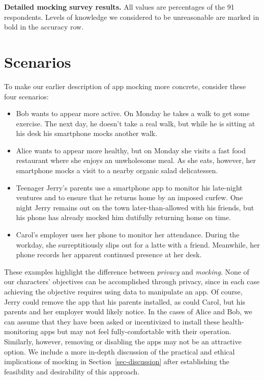 
\begin{table*}[t]



\caption{\textbf{Detailed mocking survey results.} All values are percentages
of the 91 respondents. Levels of knowledge we considered to be unreasonable
are marked in bold in the accuracy row.}

\label{table-surveyresults}

\end{table*}

\section{Scenarios}
\label{sec-scenarios}

To make our earlier description of app mocking more concrete, consider these
four scenarios:

\begin{itemize}

\item Bob wants to appear more active. On Monday he takes a walk to get some
exercise. The next day, he doesn't take a real walk, but while he is sitting
at his desk his smartphone mocks another walk.

\item Alice wants to appear more healthy, but on Monday she visits a fast
food restaurant where she enjoys an unwholesome meal. As she eats, however, her
smartphone mocks a visit to a nearby organic salad delicatessen.

\item Teenager Jerry's parents use a smartphone app to monitor his late-night
  ventures and to ensure that he returns home by an imposed curfew. One
  night Jerry remains out on the town later-than-allowed with his friends,
  but his phone has already mocked him dutifully returning home on time.

\item Carol's employer uses her phone to monitor her attendance. During the
workday, she surreptitiously slips out for a latte with a friend.  Meanwhile,
her phone records her apparent continued presence at her desk.

\end{itemize}

These examples highlight the difference between \textit{privacy} and
\textit{mocking}. None of our characters' objectives can be accomplished
through privacy, since in each case achieving the objective requires using
data to manipulate an app. Of course, Jerry could remove the app that his
parents installed, as could Carol, but his parents and her employer would
likely notice. In the cases of Alice and Bob, we can assume that they have
been asked or incentivized to install these health-monitoring apps but may
not feel fully-comfortable with their operation. Similarly, however, removing
or disabling the apps may not be an attractive option. We include a more
in-depth discussion of the practical and ethical implications of mocking in
Section~\ref{sec-discussion} after establishing the feasibility and desirability
of this approach.
